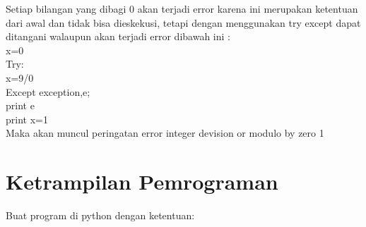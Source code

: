 \begin{enumerate}
Setiap bilangan yang dibagi 0 akan terjadi error karena ini merupakan ketentuan dari awal dan tidak bisa dieskekusi, tetapi dengan menggunakan try except dapat ditangani walaupun akan terjadi error dibawah ini : \\
x=0\\
Try:\\
x=9/0\\
Except exception,e;\\
print e\\
print x=1 \\
Maka akan muncul peringatan error integer devision or modulo by zero 1
\end{enumerate}

\section{Ketrampilan Pemrograman}
Buat program di python dengan ketentuan:
